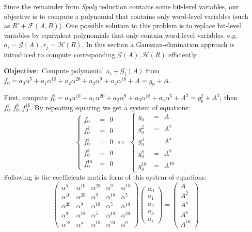 Since the remainder from \emph{Spoly} reduction contains some bit-level variables, our objective is to compute
a polynomial that contains only word-level variables (such as $R'+\mathcal{F}(A,B)$). One possible solution to
this problem is to replace bit-level variables by equivalent polynomials that only contain word-level
variables, e.g. $a_i = \mathcal{G}(A), r_j = \mathcal{H}(R)$. In this section a Gaussian-elimination
approach is introduced to compute corresponding $\mathcal{G}(A),\mathcal{H}(R)$ efficiently.

\begin{Example}
\label{ex:BLVS}
{\bf Objective}:\ Compute polynomial $a_i + \mathcal{G}_i(A)$ from $f_0 = a_0\alpha^5+a_1\alpha^{10}+a_2\alpha^{20}+a_3\alpha^9+a_4\alpha^{18}+A
 = g_0 + A$.

First, compute $f_0^2= a_0\alpha^{10}+a_1\alpha^{20}+a_2\alpha^{9}+a_3\alpha^{18}+a_4\alpha^{5}+A^2 = g_0^2 + A^2$;
then $f_0^4, f_0^8, f_0^{16}$. By repeating squaring we get a system of equations:
\begin{displaymath}
  \begin{cases}
  f_0  &=\ \  0\\
  f_0^2 & =\ \  0\\
  f_0^4  &=\ \  0\\
  f_0^8  &=\ \  0\\
  f_0^{16} & =\ \ 0
  \end{cases}
\Longleftrightarrow\ \
\begin{cases}
  g_0 & =\ \  A\\
  g_0^2 & =\ \  A^2\\
  g_0^4 & =\ \  A^4\\
  g_0^8 & =\ \  A^8\\
  g_0^{16} & =\ \  A^{16}
  \end{cases}
\end{displaymath}
Following is the coefficients matrix form of this system of equations:
\begin{displaymath}
\begin{pmatrix}
\alpha^5 & \alpha^{10} & \alpha^{20} & \alpha^9 & \alpha^{18} \\
\alpha^{10} & \alpha^{20} & \alpha^9 & \alpha^{18} & \alpha^5 \\
\alpha^{20} & \alpha^9 & \alpha^{18} & \alpha^5 & \alpha^{10} \\
\alpha^9 & \alpha^{18} & \alpha^5 & \alpha^{10} & \alpha^{20} \\
\alpha^{18} & \alpha^5 & \alpha^{10} & \alpha^{20} & \alpha^9 
\end{pmatrix}
\begin{pmatrix}
a_0\\
a_1\\
a_2\\
a_3\\
a_4
\end{pmatrix}
=
\begin{pmatrix}
A\\
A^2\\
A^4\\
A^8\\
A^{16}
\end{pmatrix}
\end{displaymath}


\end{Example}
